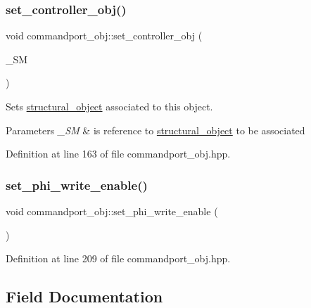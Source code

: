 \subsubsection{\texorpdfstring{set\+\_\+controller\+\_\+obj()}{set\_controller\_obj()}}
{\footnotesize\ttfamily void commandport\+\_\+obj\+::set\+\_\+controller\+\_\+obj (\begin{DoxyParamCaption}\item[{const \hyperlink{structural__objects_8hpp_a8ea5f8cc50ab8f4c31e2751074ff60b2}{structural\+\_\+object\+Ref} \&}]{\+\_\+\+SM }\end{DoxyParamCaption})\hspace{0.3cm}{\ttfamily [inline]}}



Sets \hyperlink{classstructural__object}{structural\+\_\+object} associated to this object. 


\begin{DoxyParams}{Parameters}
{\em \+\_\+\+SM} & is reference to \hyperlink{classstructural__object}{structural\+\_\+object} to be associated \\
\hline
\end{DoxyParams}


Definition at line 163 of file commandport\+\_\+obj.\+hpp.

\mbox{\label{classcommandport__obj_ad8ccac87ff5cc3880fdc8bacd1233f8c}} 
\subsubsection{\texorpdfstring{set\+\_\+phi\+\_\+write\+\_\+enable()}{set\_phi\_write\_enable()}}
{\footnotesize\ttfamily void commandport\+\_\+obj\+::set\+\_\+phi\+\_\+write\+\_\+enable (\begin{DoxyParamCaption}{ }\end{DoxyParamCaption})\hspace{0.3cm}{\ttfamily [inline]}}



Definition at line 209 of file commandport\+\_\+obj.\+hpp.



\subsection{Field Documentation}
\mbox{\label{classcommandport__obj_adb662a06af834f7d81165f47283353a1}} 
